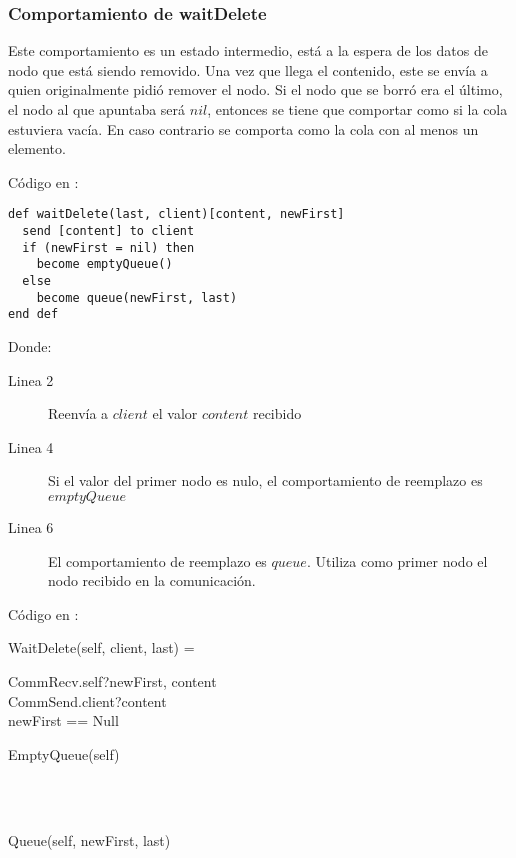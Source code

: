 \subsubsection*{Comportamiento de waitDelete}
Este comportamiento es un estado intermedio, está a la espera de los datos de nodo que está siendo removido. Una vez que llega el contenido, este se envía a quien originalmente pidió remover el nodo. Si el nodo que se borró era el último, el nodo al que apuntaba será $nil$, entonces se tiene que comportar como si la cola estuviera vacía. En caso contrario se comporta como la cola con al menos un elemento.

Código en \SAL:

\begin{lstlisting}[language=sal, style=simple]
def waitDelete(last, client)[content, newFirst]
  send [content] to client
  if (newFirst = nil) then
    become emptyQueue()
  else
    become queue(newFirst, last)
end def
\end{lstlisting}

Donde: 

\begin{description}
 \item [Linea 2] Reenvía a $client$ el valor $content$ recibido
 \item [Linea 4] Si el valor del primer nodo es nulo, el comportamiento de reemplazo es $emptyQueue$
 \item [Linea 6] El comportamiento de reemplazo es $queue$. Utiliza como primer nodo el nodo recibido en la comunicación.
\end{description}

Código en \CSP:

\begin{process}
WaitDelete(self, client, last) = \\ \quad
  \begin{block}
  CommRecv.self?\langle newFirst, content \rangle \then \\ 
  CommSend.client?\langle content \rangle \then \\ 
  \If newFirst == Null \Then \\ \quad
    \begin{block}
      EmptyQueue(self)
    \end{block} \\ 
  \Then \\ \quad
    \begin{block}
    Queue(self, newFirst, last)
    \end{block}
  \end{block} 
\end{process}

